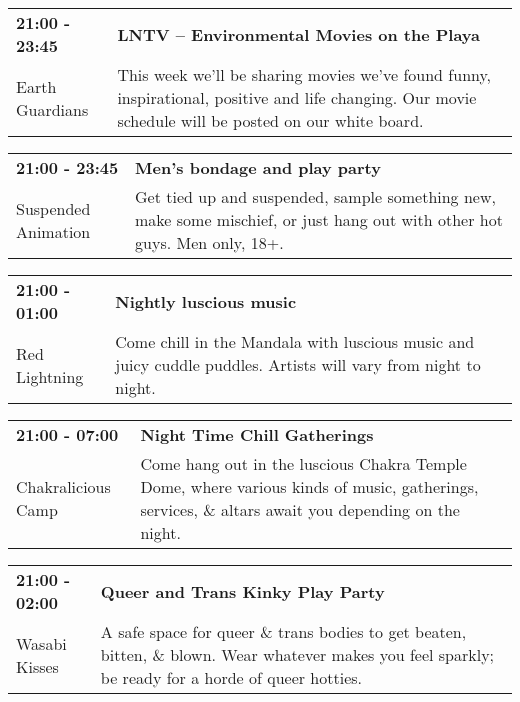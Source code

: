 \begin{tabular}{ p{1in} p{2.2in} }
    \textbf{21:00 - 23:45} & \textbf{LNTV -- Environmental Movies on the Playa } \\
    Earth Guardians \newline  & This week we'll be sharing movies we've found funny, inspirational, positive and life changing. Our movie schedule will be posted on our white board. \\
    \hline 
\end{tabular}
    
\begin{tabular}{ p{1in} p{2.2in} }
    \textbf{21:00 - 23:45} & \textbf{Men's bondage and play party} \\
    Suspended Animation \newline  & Get tied up and suspended, sample something new, make some mischief, or just hang out with other hot guys. Men only, 18+. \\
    \hline 
\end{tabular}
    
\begin{tabular}{ p{1in} p{2.2in} }
    \textbf{21:00 - 01:00} & \textbf{Nightly luscious music} \\
    Red Lightning \newline  & Come chill in the Mandala with luscious music and juicy cuddle puddles. Artists will vary from night to night. \\
    \hline 
\end{tabular}
    
\begin{tabular}{ p{1in} p{2.2in} }
    \textbf{21:00 - 07:00} & \textbf{Night Time Chill Gatherings} \\
    Chakralicious Camp \newline  & Come hang out in the luscious Chakra Temple Dome, where various kinds of music, gatherings, services, \& altars await you depending on the night. \\
    \hline 
\end{tabular}
    
\begin{tabular}{ p{1in} p{2.2in} }
    \textbf{21:00 - 02:00} & \textbf{Queer and Trans Kinky Play Party} \\
    Wasabi Kisses \newline  & A safe space for queer \& trans bodies to get beaten, bitten, \& blown. Wear whatever makes you feel sparkly; be ready for a horde of queer hotties. \\
    \hline 
\end{tabular}
    
